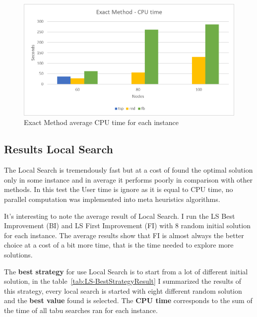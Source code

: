 	
	\begin{figure} [hb]
		\centering
		\includegraphics[width=\linewidth]{img/EM-results-time}
		\caption{Exact Method average CPU time for each instance}
		\label{fig:em-results-time}
	\end{figure}
	
	
	
\newpage
\subsection{Results Local Search}
	The Local Search is tremendously fast but at a cost of found the optimal solution only in some instance and in average it performs poorly in comparison with other methods. In this test the User time is ignore as it is equal to CPU time, no parallel computation was implemented into meta heuristics algorithms.

	It's interesting to note the average result of Local Search. I run the LS Best Improvement (BI) and LS First Improvement (FI) with 8 random initial solution for each instance. The average results show that FI is almost always the better choice at a cost of a bit more time, that is the time needed to explore more solutions.
	
	The \textbf{best strategy} for use Local Search is to start from a lot of different initial solution, in the table~\ref{tab:LS-BestStrategyResult} I summarized the results of this strategy, every local search is started with eight different random solution and the \textbf{best value} found is selected. The \textbf{CPU time} corresponds to the sum of the time of all tabu searches ran for each instance.
	
	\vspace{2cm}
	
